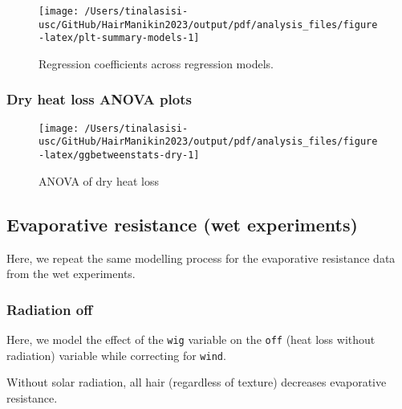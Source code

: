 \documentclass[
]{article}
\begin{document}
\begin{figure}

{\centering \texttt{[image: /Users/tinalasisi-usc/GitHub/HairManikin2023/output/pdf/analysis\_files/figure-latex/plt-summary-models-1]} 

}

\caption{Regression coefficients across regression models.}\label{fig:plt-summary-models}
\end{figure}

\hypertarget{dry-heat-loss-anova-plots}{%
\subsubsection{Dry heat loss ANOVA
plots}\label{dry-heat-loss-anova-plots}}

\begin{figure}

{\centering \texttt{[image: /Users/tinalasisi-usc/GitHub/HairManikin2023/output/pdf/analysis\_files/figure-latex/ggbetweenstats-dry-1]} 

}

\caption{ANOVA of dry heat loss}\label{fig:ggbetweenstats-dry}
\end{figure}

\hypertarget{evaporative-resistance-wet-experiments}{%
\subsection{Evaporative resistance (wet
experiments)}\label{evaporative-resistance-wet-experiments}}

Here, we repeat the same modelling process for the evaporative
resistance data from the wet experiments.

\hypertarget{radiation-off-1}{%
\subsubsection{Radiation off}\label{radiation-off-1}}

Here, we model the effect of the \texttt{wig} variable on the
\texttt{off} (heat loss without radiation) variable while correcting for
\texttt{wind}.

Without solar radiation, all hair (regardless of texture) decreases
evaporative resistance.
\end{document}
